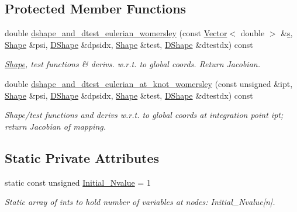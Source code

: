 \subsection*{Protected Member Functions}
\begin{DoxyCompactItemize}
\item 
double \hyperlink{classoomph_1_1QWomersleyElement_afe507e9f0d7359d47c0c682fed7c952b}{dshape\+\_\+and\+\_\+dtest\+\_\+eulerian\+\_\+womersley} (const \hyperlink{classoomph_1_1Vector}{Vector}$<$ double $>$ \&\hyperlink{cfortran_8h_ab7123126e4885ef647dd9c6e3807a21c}{s}, \hyperlink{classoomph_1_1Shape}{Shape} \&psi, \hyperlink{classoomph_1_1DShape}{D\+Shape} \&dpsidx, \hyperlink{classoomph_1_1Shape}{Shape} \&test, \hyperlink{classoomph_1_1DShape}{D\+Shape} \&dtestdx) const
\begin{DoxyCompactList}\small\item\em \hyperlink{classoomph_1_1Shape}{Shape}, test functions \& derivs. w.\+r.\+t. to global coords. Return Jacobian. \end{DoxyCompactList}\item 
double \hyperlink{classoomph_1_1QWomersleyElement_a5c4db93fb861995c7910ffe44751f449}{dshape\+\_\+and\+\_\+dtest\+\_\+eulerian\+\_\+at\+\_\+knot\+\_\+womersley} (const unsigned \&ipt, \hyperlink{classoomph_1_1Shape}{Shape} \&psi, \hyperlink{classoomph_1_1DShape}{D\+Shape} \&dpsidx, \hyperlink{classoomph_1_1Shape}{Shape} \&test, \hyperlink{classoomph_1_1DShape}{D\+Shape} \&dtestdx) const
\begin{DoxyCompactList}\small\item\em Shape/test functions and derivs w.\+r.\+t. to global coords at integration point ipt; return Jacobian of mapping. \end{DoxyCompactList}\end{DoxyCompactItemize}
\subsection*{Static Private Attributes}
\begin{DoxyCompactItemize}
\item 
static const unsigned \hyperlink{classoomph_1_1QWomersleyElement_ae91c242198d9b4683a446f711e6acd4b}{Initial\+\_\+\+Nvalue} = 1
\begin{DoxyCompactList}\small\item\em Static array of ints to hold number of variables at nodes\+: Initial\+\_\+\+Nvalue\mbox{[}n\mbox{]}. \end{DoxyCompactList}\end{DoxyCompactItemize}
